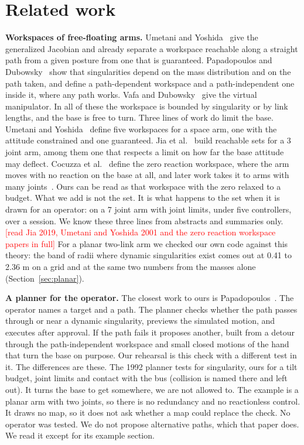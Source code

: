 \documentclass[pdflatex,sn-mathphys-num]{sn-jnl}
\newcommand{\todo}[1]{\textcolor{red}{[#1]}}
\begin{document}
\section{Related work}
\textbf{Workspaces of free-floating arms.} Umetani and Yoshida~\cite{umetani1989} give the generalized Jacobian
and already separate a workspace reachable along a straight path from a given posture from one that is guaranteed.
Papadopoulos and Dubowsky~\cite{papadopoulos1993} show that singularities depend on the mass distribution and on
the path taken, and define a path-dependent workspace and a path-independent one inside it, where any path works.
Vafa and Dubowsky~\cite{vafa1990} give the virtual manipulator. In all of these the workspace is bounded by
singularity or by link lengths, and the base is free to turn. Three lines of work do limit the base. Umetani and
Yoshida~\cite{umetani2001} define five workspaces for a space arm, one with the attitude constrained and one
guaranteed. Jia et al.~\cite{jia2019} build reachable sets for a 3 joint arm, among them one that respects a limit
on how far the base attitude may deflect. Cocuzza et al.~\cite{cocuzza2010} define the zero reaction workspace,
where the arm moves with no reaction on the base at all, and later work takes it to arms with many
joints~\cite{cocuzza2013}. Ours can be read as that workspace with the zero relaxed to a budget. What we add is not
the set. It is what happens to the set when it is drawn for an operator: on a 7 joint arm with joint limits, under
five controllers, over a session. We know these three lines from abstracts and summaries only. \todo{read Jia 2019,
Umetani and Yoshida 2001 and the zero reaction workspace papers in full} For a planar two-link arm we checked our
own code against this theory: the band of radii where dynamic singularities exist comes out at 0.41 to 2.36 m on a
grid and at the same two numbers from the masses alone (Section~\ref{sec:planar}).

\textbf{A planner for the operator.} The closest work to ours is Papadopoulos~\cite{papadopoulos1992}. The
operator names a target and a path. The planner checks whether the path passes through or near a dynamic
singularity, previews the simulated motion, and executes after approval. If the path fails it proposes another,
built from a detour through the path-independent workspace and small closed motions of the hand that turn the
base on purpose. Our rehearsal is this check with a different test in it. The differences are these. The 1992
planner tests for singularity, ours for a tilt budget, joint limits and contact with the bus (collision is named
there and left out). It turns the base to get somewhere, we are not allowed to. The example is a planar arm with
two joints, so there is no redundancy and no reactionless control. It draws no map, so it does not ask whether a
map could replace the check. No operator was tested. We do not propose alternative paths, which that paper does. We read it except for its example section.
\end{document}
